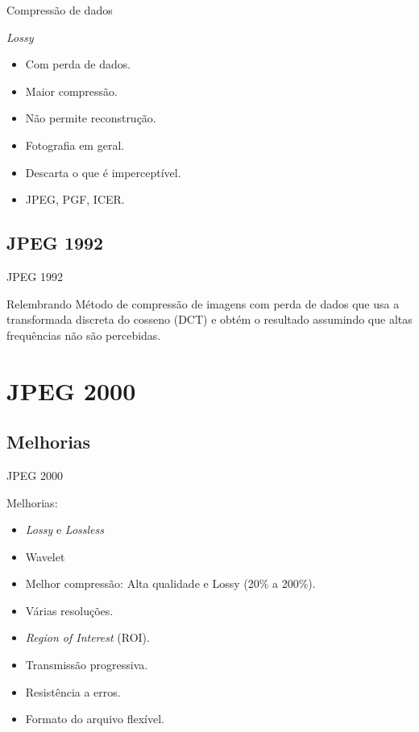 \documentclass{beamer}
\begin{document}
  \begin{frame}{Compressão de dados}
    \begin{block}{\textit{Lossy}}
      \begin{itemize}
        \item Com perda de dados.
        \item Maior compressão.
        \item Não permite reconstrução.
        \item Fotografia em geral.
        \item Descarta o que é imperceptível.
        \item JPEG, PGF, ICER.
      \end{itemize}
    \end{block}
  \end{frame}

  \subsection{JPEG 1992}
  \begin{frame}{JPEG 1992}
    \begin{block}{Relembrando}
      Método de compressão de imagens com perda de dados que usa a transformada discreta do cosseno (DCT) e obtém o resultado assumindo que altas frequências não são percebidas.
    \end{block}
  \end{frame}

  \section{JPEG 2000}
  \subsection{Melhorias}
  \begin{frame}{JPEG 2000}
    \begin{block}{Melhorias:}
      \begin{itemize}
        \item \emph{Lossy} e \emph{Lossless}
        \item Wavelet
        \item Melhor compressão: Alta qualidade e Lossy (20\% a 200\%).
        \item Várias resoluções.
        \item \emph{Region of Interest} (ROI).
        \item Transmissão progressiva.
        \item Resistência a erros.
        \item Formato do arquivo flexível.
      \end{itemize}
    \end{block}
  \end{frame}
\end{document}

